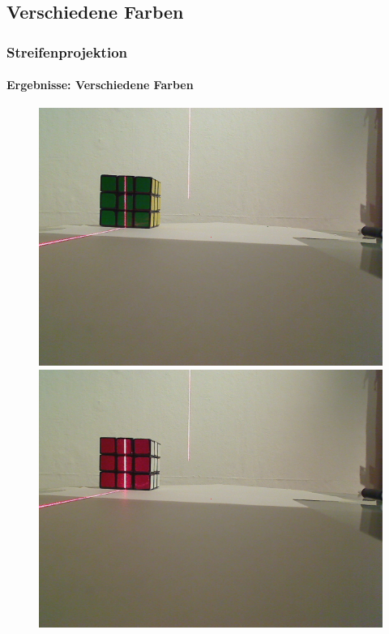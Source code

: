 \documentclass[xcolor=dvipsnames]{beamer}
\begin{document}
\subsection{Verschiedene Farben}
\begin{frame}
	\frametitle{Streifenprojektion}
	\framesubtitle{Ergebnisse: Verschiedene Farben}

	\begin{figure}
		\begin{minipage}{0.32\linewidth}
			\includegraphics[width=\linewidth]{includes/test_color_1}
		\end{minipage}
		\hfill
		\begin{minipage}{0.32\linewidth}
			\includegraphics[width=\linewidth]{includes/test_color_2}

\end{minipage}
\end{figure}
\end{frame}
\end{document}
